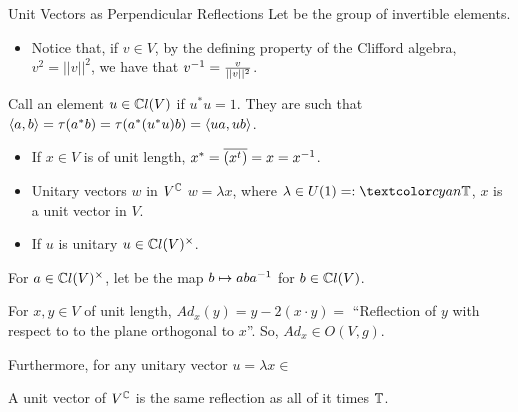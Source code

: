 \begin{frame}{Unit Vectors as Perpendicular Reflections} %
    Let  be the group of invertible elements.
        \begin{itemize}
            
        \item Notice that, if $v \in V$, by the defining property of the Clifford algebra, $v^2 = ||v||^2$, we have that $v^{-1} = \frac{v}{||v||^2}$.
            
        \end{itemize}
    
    Call an element $u \in \mathbb C l(V)$  if $u^* u = 1$. They are such that $\langle a, b \rangle = \tau(a^* b) = \tau(a^*(u^* u) b)  = \langle ua, ub \rangle$.
        \begin{itemize}
            
        \item If $x \in V$ is of unit length,  $x^* = \overline{(x^t)} = x = x^
        {-1}$.
        
        \item Unitary vectors $w$ in $V^\mathbb C$ \Iff $w = \lambda x$, where $\lambda \in U(1) =: \defn{\TT}$, $x$ is a unit vector in $V$.
        
        \item If $u$ is unitary \then $u \in \mathbb C l(V)^\times$.
            
        \end{itemize}
    
    For $a \in \mathbb C l(V)^\times$, let  be the map $b \mapsto a b a^{-1}$ for $b \in \mathbb C l(V)$.
    

\end{frame}

\begin{frame} %
    \begin{proposition}
    For $x, y \in V$ of unit length, $Ad_x(y) = y - 2 (x \cdot y) = $ ``Reflection of $y$ with respect to to the plane orthogonal to $x$''. So, $Ad_x \in O(V, g)$.
    \end{proposition}
    
    Furthermore, for any unitary vector $u = \lambda x \in $
    
    
    
    
    A unit vector of $V^\mathbb C$ is the same reflection as all of it times $\mathbb T$.
\end{frame}


